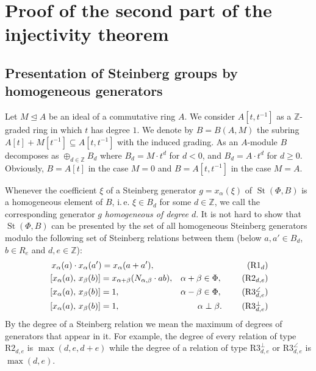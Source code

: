 \documentclass[oneside, 8pt]{amsart}
\theoremstyle{remark}
\theoremstyle{definition}
\numberwithin{lemma}{section}
\numberwithin{prop}{section}
\numberwithin{corollary}{section}
\DeclareMathOperator{\St}{St}
\newcommand{\inv}{^{-1}}
\numberwithin{equation}{section}
\begin{document}
\section{Proof of the second part of the injectivity theorem}
\subsection{Presentation of Steinberg groups by homogeneous generators}
\label{sec:presentation}
Let $M\trianglelefteq A$ be an ideal of a commutative ring $A$.
We consider $A[t, t\inv]$ as a $\mathbb{Z}$-graded ring in which $t$ has degree $1$.
We denote by $B = B(A, M)$ the subring $A[t] + M[t\inv] \subseteq A[t, t\inv]$ with the induced grading.
As an $A$-module $B$ decomposes as $\oplus_{d\in\mathbb Z}B_d$ where $B_d=M \cdot t^d$ for $d<0$, and $B_d=A \cdot t^d$ for $d\geq0$. Obviously, $B = A[t]$ in the case $M=0$ and $B = A[t, t\inv]$ in the case $M=A$.

Whenever the coefficient $\xi$ of a Steinberg generator $g = x_\alpha(\xi)$ of $\St(\Phi, B)$ is a homogeneous element of $B$, i.\,e. $\xi \in B_d$ for some $d \in \mathbb{Z}$,
 we call the corresponding generator $g$ {\it homogeneous of degree $d$}.
It is not hard to show that $\St(\Phi, B)$ can be presented by the set of all homogeneous Steinberg generators modulo the following set of Steinberg relations
 between them (below $a, a' \in B_d$, $b\in R_e$ and $d,e \in \mathbb{Z}$): 
\begin{align}
&\,\,x_{\alpha}(a)\cdot x_{\alpha}(a') =  x_{\alpha}(a+a'),                        & \tag{R$1_d$} \\
&\,[x_{\alpha}(a),\,x_{\beta}(b)]= x_{\alpha+\beta}(N_{\alpha, \beta} \cdot ab),   & \alpha + \beta \in \Phi,\ \tag{R$2_{d,e}$} \\
&\,[x_{\alpha}(a),\,x_{\beta}(b)]= 1,                                              & \alpha - \beta \in \Phi,\ \tag{R$3^\angle_{d,e}$} \\
&\,[x_{\alpha}(a),\,x_{\beta}(b)]= 1,                                              & \alpha \perp \beta.\ \tag{R$3^\bot_{d,e}$}
\end{align}
By the degree of a Steinberg relation we mean the maximum of degrees of generators that appear in it.
For example, the degree of every relation of type $\text{R2}_{d,e}$ is $\max(d,e,d+e)$ 
 while the degree of a relation of type $\text{R3}^\bot_{d,e}$ or $\text{R3}^\angle_{d,e}$ is $\max(d,e)$.
\end{document}
